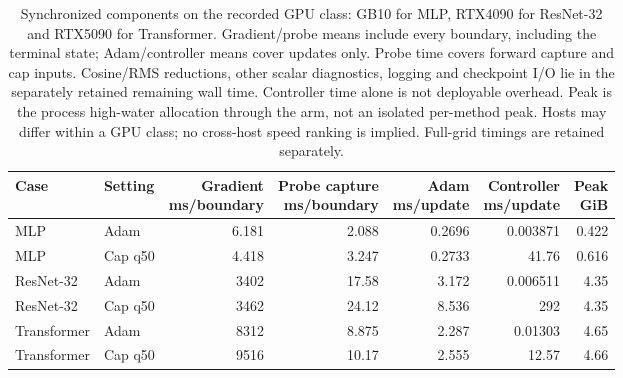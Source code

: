 \begin{table}[t]
\centering\small
\setlength{\tabcolsep}{4pt}
\begin{tabular}{llrrrrr}
\toprule
Case & Setting & \shortstack{Gradient\\ms/boundary} & \shortstack{Probe capture\\ms/boundary} & \shortstack{Adam\\ms/update} & \shortstack{Controller\\ms/update} & \shortstack{Peak\\GiB} \\
\midrule
MLP & Adam & 6.181 & 2.088 & 0.2696 & 0.003871 & 0.422 \\
MLP & Cap q50 & 4.418 & 3.247 & 0.2733 & 41.76 & 0.616 \\
ResNet-32 & Adam & 3402 & 17.58 & 3.172 & 0.006511 & 4.35 \\
ResNet-32 & Cap q50 & 3462 & 24.12 & 8.536 & 292 & 4.35 \\
Transformer & Adam & 8312 & 8.875 & 2.287 & 0.01303 & 4.65 \\
Transformer & Cap q50 & 9516 & 10.17 & 2.555 & 12.57 & 4.66 \\
\bottomrule
\end{tabular}
\caption{Synchronized components on the recorded GPU class: GB10 for MLP, RTX4090 for ResNet-32 and RTX5090 for Transformer. Gradient/probe means include every boundary, including the terminal state; Adam/controller means cover updates only. Probe time covers forward capture and cap inputs. Cosine/RMS reductions, other scalar diagnostics, logging and checkpoint I/O lie in the separately retained remaining wall time. Controller time alone is not deployable overhead. Peak is the process high-water allocation through the arm, not an isolated per-method peak. Hosts may differ within a GPU class; no cross-host speed ranking is implied. Full-grid timings are retained separately.}
\end{table}
